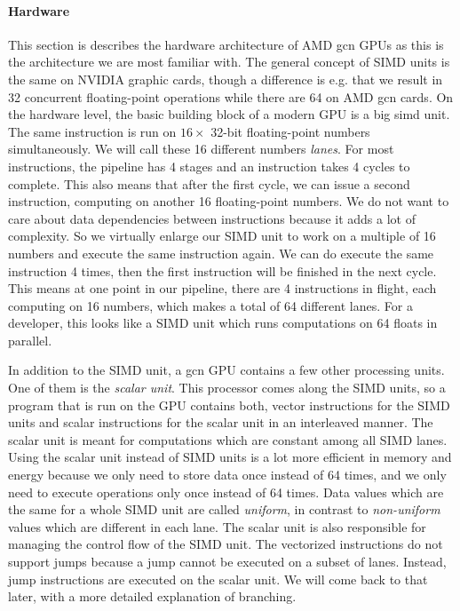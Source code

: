 \paragraph{Hardware} This section is describes the hardware architecture of AMD \gls{gcn} GPUs as this is the architecture we are most familiar with. The general concept of SIMD units is the same on NVIDIA graphic cards, though a difference is e.g. that we result in 32 concurrent floating-point operations while there are 64 on AMD \gls{gcn} cards. On the hardware level, the basic building block of a modern GPU is a big \gls{simd} unit. The same instruction is run on $16 \times$ 32-bit floating-point numbers simultaneously. We will call these 16 different numbers \emph{lanes}. For most instructions, the pipeline has 4 stages and an instruction takes 4 cycles to complete. This also means that after the first cycle, we can issue a second instruction, computing on another 16 floating-point numbers. We do not want to care about data dependencies between instructions because it adds a lot of complexity. So we virtually enlarge our SIMD unit to work on a multiple of 16 numbers and execute the same instruction again. We can do execute the same instruction 4 times, then the first instruction will be finished in the next cycle. This means at one point in our pipeline, there are 4 instructions in flight, each computing on 16 numbers, which makes a total of 64 different lanes. For a developer, this looks like a SIMD unit which runs computations on 64 floats in parallel.

In addition to the SIMD unit, a \gls{gcn} GPU contains a few other processing units. One of them is the \emph{scalar unit}. This processor comes along the SIMD units, so a program that is run on the GPU contains both, vector instructions for the SIMD units and scalar instructions for the scalar unit in an interleaved manner. The scalar unit is meant for computations which are constant among all SIMD lanes. Using the scalar unit instead of SIMD units is a lot more efficient in memory and energy because we only need to store data once instead of 64 times, and we only need to execute operations only once instead of 64 times. Data values which are the same for a whole SIMD unit are called \emph{uniform}, in contrast to \emph{non-uniform} values which are different in each lane. The scalar unit is also responsible for managing the control flow of the SIMD unit. The vectorized instructions do not support jumps because a jump cannot be executed on a subset of lanes. Instead, jump instructions are executed on the scalar unit. We will come back to that later, with a more detailed explanation of branching.

